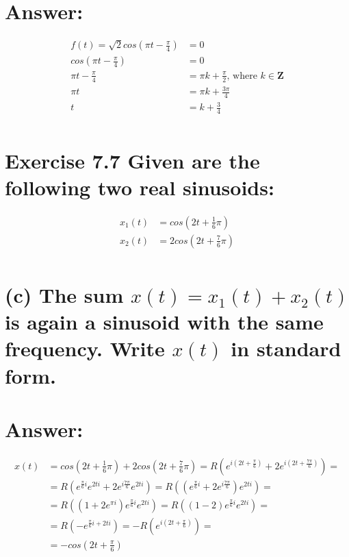 \documentclass[15px]{article}
\begin{document}
\section*{Answer: }

\begin{equation}
\begin{split}
f(t) = \sqrt{2}cos(\pi t - \frac{\pi}{4}) & = 0 \\
cos(\pi t - \frac{\pi}{4}) & = 0 \\
\pi t - \frac{\pi}{4} & = \pi k + \frac{\pi}{2}\text{, where } k\in\mathbf{Z} \\
\pi t & = \pi k + \frac{3\pi}{4} \\ 
t & = k + \frac{3}{4} \\
\end{split}
\end{equation}

\section*{Exercise 7.7 \normalfont Given are the following two real sinusoids:}

\begin{equation}
\begin{split}
x_1(t) & = cos(2t + \frac{1}{6}\pi) \\
x_2(t) & = 2cos(2t + \frac{7}{6}\pi) \\
\end{split}
\end{equation}

\section*{\normalfont (c) The sum $x(t) = x_1(t) + x_2(t)$ is again a sinusoid with the same frequency. Write $x(t)$ in standard form.}

\section*{Answer:}

\begin{equation}
\begin{split}
x(t) & = cos(2t + \frac{1}{6}\pi) + 2cos(2t + \frac{7}{6}\pi) = R(e^{i(2t + \frac{\pi}{6})} + 2e^{i(2t + \frac{7\pi}{6})}) = \\
& = R(e^{\frac{\pi}{6}i}e^{2ti} + 2e^{i\frac{7\pi}{6}}e^{2ti}) = R((e^{\frac{\pi}{6}i} + 2e^{i\frac{7\pi}{6}})e^{2ti}) = \\
& = R((1 + 2e^{\pi i}) e^{\frac{\pi}{6}i} e^{2ti}) = R((1 - 2) e^{\frac{\pi}{6}i} e^{2ti}) = \\
& = R(-e^{\frac{\pi}{6}i + 2t i} ) = -R(e^{i(2t + \frac{\pi}{6})}) = \\
& = -cos(2t + \frac{\pi}{6})
\end{split}
\end{equation}
\end{document}
